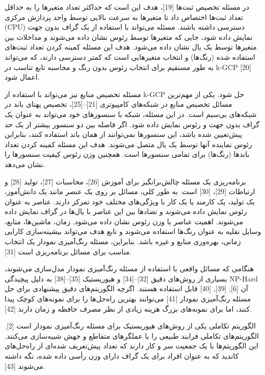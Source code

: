 \documentclass[a4paper,10pt]{article}
\begin{document}
        در مسئله تخصیص ثبت‌ها [19]، هدف این است که حداکثر تعداد متغیرها را به حداقل تعداد ثبت‌ها اختصاص داد تا متغیرها به سرعت بالایی توسط واحد پردازش مرکزی (CPU) دسترسی داشته باشند. مسئله می‌تواند با استفاده از یک گراف بدون جهت نمایش داده شود، جایی که متغیرها توسط رئوس نشان داده می‌شوند و مداخلات بین متغیرها توسط یک یال نشان داده می‌شود. هدف این مسئله کمینه کردن تعداد ثبت‌های استفاده شده (رنگ‌ها) و انتخاب متغیرهایی است که کمتر دسترسی دارند، که می‌تواند به طور مستقیم برای انتخاب رئوس بدون رنگ و محاسبه تابع تناسب در k-GCP [20] اعمال شود.

        مسئله تخصیص منابع نیز می‌تواند با استفاده از k-GCP حل شود. یکی از مهم‌ترین مسائل تخصیص منابع در شبکه‌های کامپیوتری [21]–[25]، تخصیص پهنای باند در شبکه‌های بی‌سیم است. در این مسئله، شبکه با سنسورهای خود می‌تواند به عنوان یک گراف بدون جهت و رئوس نمایش داده شود. اگر فاصله بین دو سنسور بیشتر از یک حد پیش‌تعیین شده باشد، این سنسورها نمی‌توانند از همان باند استفاده کنند، بنابراین رئوس نماینده آنها توسط یک یال متصل می‌شوند. هدف این مسئله کمینه کردن تعداد باندها (رنگ‌ها) برای تمامی سنسورها است. همچنین وزن رئوس کیفیت سنسورها را نشان می‌دهد.

        برنامه‌ریزی یک مسئله چالش‌برانگیز برای آموزش [26]، محاسبات [27]، تولید [28] و ارتباطات [29]، [30] است. به طور کلی، مسائل بر روی یک عنصر مانند یک دانش‌آموز، یک تولید، یک کارمند یا یک کار با ویژگی‌های مختلف خود تمرکز دارند. عناصر به عنوان رئوس نمایش داده می‌شوند و تضادها بین این عناصر با یال‌ها در گراف نمایش داده می‌شوند. اهمیت عناصر با وزن رئوس نشان داده می‌شود. زمان، ماشین‌ها، منابع، وسایل نقلیه به عنوان رنگ‌ها استفاده می‌شوند و تابع هدف می‌تواند بیشینه‌سازی کارایی زمانی، بهره‌وری منابع و غیره باشد. بنابراین، مسئله رنگ‌آمیزی نمودار یک انتخاب مناسب برای مسائل برنامه‌ریزی است [31].

        هنگامی که مسائل واقعی با استفاده از مسئله رنگ‌آمیزی نمودار مدل‌سازی می‌شوند، بسیاری از روش‌های دقیق [32]–[34] و هیوریستیک [35]–[38] به دلیل پیچیدگی NP-Hard آن [6], [39], [40] قابل استفاده هستند. اگرچه الگوریتم‌های دقیق پیشنهادی برای حل مسئله رنگ‌آمیزی نمودار [41] می‌توانند بهترین راه‌حل‌ها را برای نمونه‌های کوچک پیدا کنند، اما برای نمونه‌های بزرگ هزینه زیادی از نظر مصرف حافظه و زمان دارند [42].

        الگوریتم تکاملی یکی از روش‌های هیوریستیک برای مسئله رنگ‌آمیزی نمودار است [2]. الگوریتم‌های تکاملی فرایند طبیعی را با عملگرهای متقاطع و جهش شبیه‌سازی می‌کنند. این الگوریتم‌ها با یک جمعیت سر و کار دارند که تعداد پیش‌تعریف شده‌ای از راه‌حل‌های کاندید که به عنوان افراد برای یک گراف دارای وزن رأسی داده شده، نگه داشته می‌شوند [43].
\end{document}
